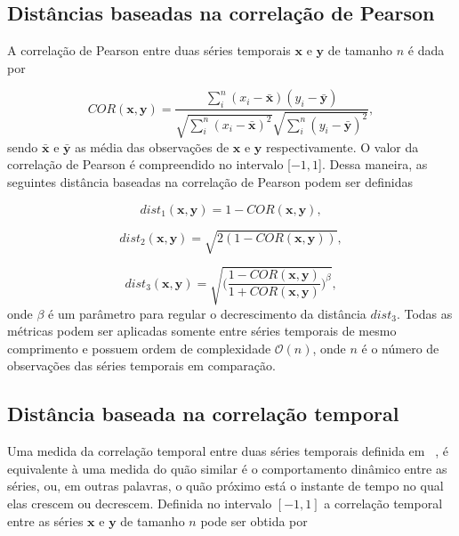 \subsection{Distâncias baseadas na correlação de Pearson}

A correlação de Pearson entre duas séries temporais $\bm{x}$ e $\bm{y}$ de tamanho $n$ é dada por

\begin{equation} \label{d_COR}
COR (\bm{x},\bm{y}) = \frac{\sum_{i}^{n}(x_i-\bm{\bar{x}}) (y_i-\bm{\bar{y}})}{\sqrt{\sum_{i}^{n}(x_i-\bm{\bar{x}})^2}\sqrt{\sum_{i}^{n}(y_i-\bm{\bar{y}})^2}},
\end{equation}
sendo $\bar{\bm{x}}$ e $\bar{\bm{y}}$ as média das observações de $\bm{x}$ e $\bm{y}$ respectivamente. O valor da correlação de Pearson é compreendido no intervalo [$-1,1$]. Dessa maneira, as seguintes distância baseadas na correlação de Pearson podem ser definidas

\begin{equation}
dist_1(\bm{x},\bm{y})  = 1-COR(\bm{x},\bm{y}),
\end{equation}

\begin{equation}
dist_2(\bm{x},\bm{y})  = \sqrt{2(1-COR(\bm{x},\bm{y}))},
\end{equation}

\begin{equation}
dist_3(\bm{x},\bm{y}) = \sqrt{\Bigg(\frac{1-COR(\bm{x},\bm{y})}{1+COR(\bm{x},\bm{y})}\Bigg)^\beta},
\end{equation}
onde $\beta$ é um parâmetro para regular o decrescimento da distância $dist_3$. Todas as métricas podem ser aplicadas somente entre séries temporais de mesmo comprimento e possuem ordem de complexidade $\mathcal{O}(n)$, onde $n$ é o número de observações das séries temporais em comparação. 

\subsection{Distância baseada na correlação temporal}

Uma medida da correlação temporal entre duas séries temporais definida em ~\parencite{cort}, é equivalente à uma medida do quão similar é o comportamento dinâmico entre as séries, ou, em outras palavras, o quão próximo está o instante de tempo no qual elas crescem ou decrescem. Definida no intervalo $[-1,1]$ a correlação temporal entre as séries $\bm{x}$ e $\bm{y}$ de tamanho $n$ pode ser obtida por

